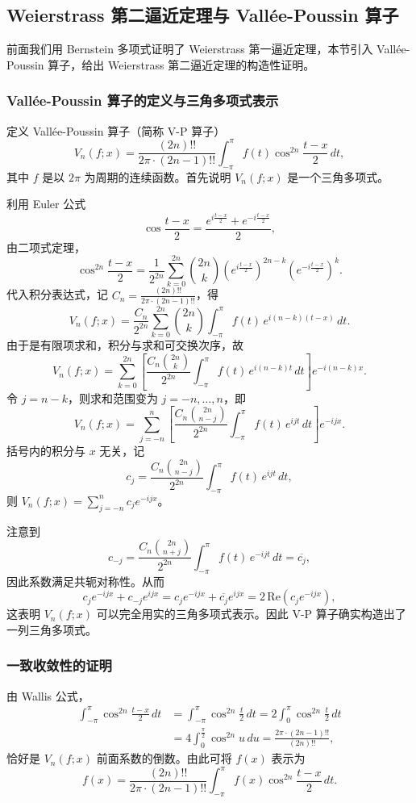\subsection{Weierstrass 第二逼近定理与 Vallée-Poussin 算子}

前面我们用 Bernstein 多项式证明了 Weierstrass 第一逼近定理，本节引入 Vallée-Poussin 算子，给出 Weierstrass 第二逼近定理的构造性证明。

\subsubsection{Vallée-Poussin 算子的定义与三角多项式表示}

定义 Vallée-Poussin 算子（简称 V-P 算子）
\[
V_n(f;x) = \frac{(2n)!!}{2\pi\cdot(2n-1)!!}\int_{-\pi}^{\pi} f(t)\cos^{2n}\frac{t-x}{2}\,dt,
\]
其中 $f$ 是以 $2\pi$ 为周期的连续函数。首先说明 $V_n(f;x)$ 是一个三角多项式。

利用 Euler 公式
\[
\cos\frac{t-x}{2} = \frac{e^{i\frac{t-x}{2}} + e^{-i\frac{t-x}{2}}}{2},
\]
由二项式定理，
\[
\cos^{2n}\frac{t-x}{2} = \frac{1}{2^{2n}} \sum_{k=0}^{2n} \binom{2n}{k} \left(e^{i\frac{t-x}{2}}\right)^{2n-k} \left(e^{-i\frac{t-x}{2}}\right)^k.
\]
代入积分表达式，记 $C_n = \frac{(2n)!!}{2\pi\cdot(2n-1)!!}$，得
\[
V_n(f;x) = \frac{C_n}{2^{2n}} \sum_{k=0}^{2n} \binom{2n}{k} \int_{-\pi}^{\pi} f(t)\, e^{i(n-k)(t-x)}\,dt.
\]
由于是有限项求和，积分与求和可交换次序，故
\[
V_n(f;x) = \sum_{k=0}^{2n} \left[ \frac{C_n \binom{2n}{k}}{2^{2n}} \int_{-\pi}^{\pi} f(t)\, e^{i(n-k)t}\,dt \right] e^{-i(n-k)x}.
\]
令 $j = n-k$，则求和范围变为 $j = -n, \dots, n$，即
\[
V_n(f;x) = \sum_{j=-n}^{n} \left[ \frac{C_n \binom{2n}{n-j}}{2^{2n}} \int_{-\pi}^{\pi} f(t)\, e^{ijt}\,dt \right] e^{-ijx}.
\]
括号内的积分与 $x$ 无关，记
\[
c_j = \frac{C_n \binom{2n}{n-j}}{2^{2n}} \int_{-\pi}^{\pi} f(t)\, e^{ijt}\,dt,
\]
则 $V_n(f;x) = \sum_{j=-n}^{n} c_j e^{-ijx}$。

注意到
\[
c_{-j} = \frac{C_n \binom{2n}{n+j}}{2^{2n}} \int_{-\pi}^{\pi} f(t)\, e^{-ijt}\,dt = \overline{c_j},
\]
因此系数满足共轭对称性。从而
\[
c_j e^{-ijx} + c_{-j} e^{ijx} = c_j e^{-ijx} + \overline{c_j} e^{ijx} = 2\,\text{Re}(c_j e^{-ijx}),
\]
这表明 $V_n(f;x)$ 可以完全用实的三角多项式表示。因此 V-P 算子确实构造出了一列三角多项式。

\subsubsection{一致收敛性的证明}

由 Wallis 公式，
\begin{align*}
\int_{-\pi}^{\pi} \cos^{2n}\frac{t-x}{2}\,dt
&= \int_{-\pi}^{\pi} \cos^{2n}\frac{t}{2}\,dt
= 2\int_{0}^{\pi} \cos^{2n}\frac{t}{2}\,dt \\
&= 4\int_{0}^{\frac{\pi}{2}} \cos^{2n} u\,du
= \frac{2\pi\cdot(2n-1)!!}{(2n)!!},
\end{align*}
恰好是 $V_n(f;x)$ 前面系数的倒数。由此可将 $f(x)$ 表示为
\[
f(x) = \frac{(2n)!!}{2\pi\cdot(2n-1)!!}\int_{-\pi}^{\pi} f(x)\cos^{2n}\frac{t-x}{2}\,dt.
\]

